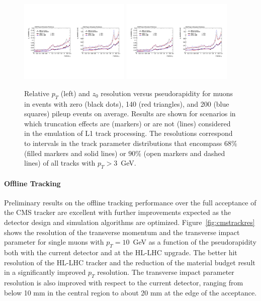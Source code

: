 \begin{figure}[h!tbp]
\begin{center}
  \includegraphics[width=0.47\textwidth]{figures/cmsupgrade/TDR-17-001_fig6_8_a.pdf} \hfill
  \includegraphics[width=0.47\textwidth]{figures/cmsupgrade/TDR-17-001_fig6_8_b.pdf}
  \caption{ Relative $p_T$ (left) and $z_0$ resolution versus pseudorapidity for muons in \ttbar events with zero (black dots), 140 (red triangles), and 200 (blue squares) pileup events on average. 
Results are shown for scenarios in which truncation effects are (markers) or are not (lines) considered in the emulation of L1 track processing. 
The resolutions correspond to intervals in the track parameter distributions that encompass $68\%$ (filled markers and solid lines) or $90\%$ (open markers and dashed lines) of all tracks with $p_T > 3$~GeV.  }
  \label{fig:cmsL1tracks}
\end{center}
\end{figure}

\paragraph{Offline Tracking}

Preliminary results on the offline tracking performance over the full acceptance of the CMS tracker are excellent with further improvements expected as the detector design and simulation algorithms are optimized.
Figure~\ref{fig:cmstrackres} shows the resolution of the transverse momentum and the transverse impact parameter
for single muons with $p_T = 10$~GeV as a function of the pseudorapidity both with the current
detector and at the HL-LHC upgrade. The better hit resolution of the HL-LHC tracker and the reduction of the material budget result in a significantly improved
$p_T$ resolution. The transverse impact parameter resolution is also improved with respect to the current detector, ranging from below 10 mm in the central region to about 20 mm at the edge of the acceptance.

